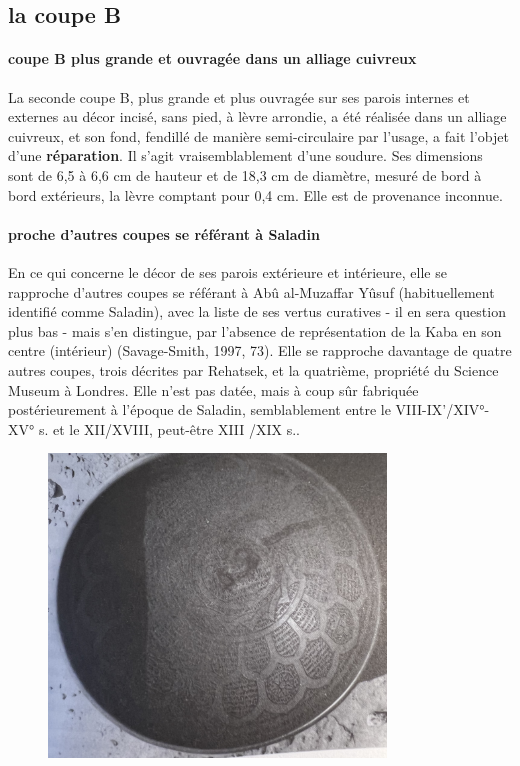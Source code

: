 \subsection{la coupe B}
\paragraph{coupe B plus grande et ouvragée dans un alliage cuivreux}
La seconde coupe B, plus grande et plus ouvragée sur ses parois internes et externes au décor incisé, sans pied, à lèvre arrondie, a été réalisée dans un alliage cuivreux, et son fond, fendillé de manière semi-circulaire par l'usage, a fait l'objet d'une \textbf{réparation}. Il s'agit vraisemblablement d'une soudure. Ses dimensions sont de 6,5 à 6,6 cm de hauteur et de 18,3 cm de diamètre, mesuré de bord à bord extérieurs, la lèvre comptant pour 0,4 cm. Elle est de provenance inconnue. 

\paragraph{proche d'autres coupes se référant à Saladin}En ce qui concerne le décor de ses parois extérieure et intérieure, elle se rapproche d'autres coupes se référant à Abû al-Muzaffar Yûsuf (habituellement identifié comme Saladin), avec la liste de ses vertus curatives - il en sera question plus bas - mais s'en distingue, par l'absence de représentation de la Kaba en son centre (intérieur) (Savage-Smith, 1997, 73). Elle se rapproche davantage de quatre autres coupes, trois décrites par Rehatsek, et la quatrième, propriété du Science Museum à Londres. Elle n'est pas datée, mais à coup sûr fabriquée postérieurement à l'époque de Saladin,  semblablement entre le VIII-IX'/XIV°-XV° s. et le XII/XVIII, peut-être XIII /XIX s..
\begin{figure}
    \centering
 \includegraphics[width=0.8\textwidth]{HommeetIslam/Images/IMG_2457recadre.png}

 
    \label{fig:my_label}
\end{figure}

